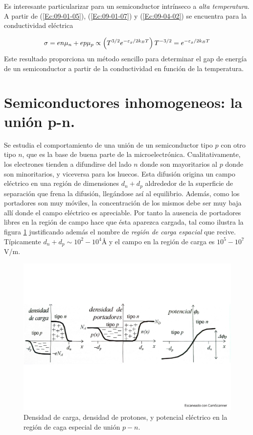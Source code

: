 Es interesante particularizar para un semiconductor intrínseco a \textit{alta temperatura}. A partir de (\ref{Ec:09-01-05}), (\ref{Ec:09-01-07}) y (\ref{Ec:09-04-02}) se encuentra para la conductividad eléctrica

\begin{equation}
	\sigma = en\mu_n + ep\mu_p \propto \left( T^{3/2}e^{-\varepsilon_g/2k_BT} \right)T^{-3/2}  = e^{-\varepsilon_g/2k_BT}
\end{equation}
Este resultado proporciona un método sencillo para determinar el gap de energía de un semiconductor a partir de la conductividad en función de la temperatura.

\section{Semiconductores inhomogeneos: la unión p-n.}

Se estudia el comportamiento de una unión de un semiconductor tipo $p$ con otro tipo $n$, que es la base de buena parte de la microelectrónica. Cualitativamente, los electrones tienden a difundirse del lado $n$ donde son mayoritarios al $p$ donde son minoritarios, y viceversa para los huecos. Esta difusión origina un campo eléctrico en una región de dimensiones $d_n+d_p$ aldrededor de la superficie de separación que frena la difusión, llegándose así al equilibrio. Además, como los portadores son muy móviles, la concentración de los mismos debe ser muy baja allí donde el campo eléctrico es apreciable. Por tanto la ausencia de portadores libres en la región de campo hace que ésta aparezca cargada, tal como ilustra la figura \ref{Fig:09-06} justificando además el nombre de \textit{región de carga espacial} que recive. Típicamente $d_n+d_p\sim10^2 - 10^4 \unit{\angstrom}$ y el campo en la región de carga es $10^5 - 10^7$ V/m.


\begin{figure}[h!] \centering
	\includegraphics[scale=0.35]{Cuerpo/Ch_09/Fotos libro 6.pdf}
	\caption{Densidad de carga, densidad de protones, y potencial eléctrico en la región de caga especial de unión $p-n$.}
	\label{Fig:09-06}
\end{figure}

